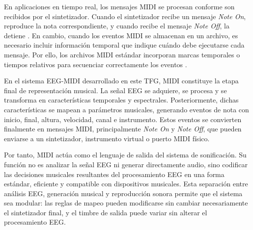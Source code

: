 \documentclass[../main.tex]{subfiles}
\begin{document}
En aplicaciones en tiempo real, los mensajes MIDI se procesan conforme son recibidos por el sintetizador. Cuando el sintetizador recibe un mensaje \textit{Note On}, reproduce la nota correspondiente, y cuando recibe el mensaje \textit{Note Off}, la detiene \cite{Heckroth1995}. En cambio, cuando los eventos MIDI se almacenan en un archivo, es necesario incluir información temporal que indique cuándo debe ejecutarse cada mensaje. Por ello, los archivos MIDI estándar incorporan marcas temporales o tiempos relativos para secuenciar correctamente los eventos \cite{Heckroth1995}.

En el sistema EEG-MIDI desarrollado en este TFG, MIDI constituye la etapa final de representación musical. La señal EEG se adquiere, se procesa y se transforma en características temporales y espectrales. Posteriormente, dichas características se mapean a parámetros musicales, generando eventos de nota con inicio, final, altura, velocidad, canal e instrumento. Estos eventos se convierten finalmente en mensajes MIDI, principalmente \textit{Note On} y \textit{Note Off}, que pueden enviarse a un sintetizador, instrumento virtual o puerto MIDI físico.

Por tanto, MIDI actúa como el lenguaje de salida del sistema de sonificación. Su función no es analizar la señal EEG ni generar directamente audio, sino codificar las decisiones musicales resultantes del procesamiento EEG en una forma estándar, eficiente y compatible con dispositivos musicales. Esta separación entre análisis EEG, generación musical y reproducción sonora permite que el sistema sea modular: las reglas de mapeo pueden modificarse sin cambiar necesariamente el sintetizador final, y el timbre de salida puede variar sin alterar el procesamiento EEG.
\end{document}
